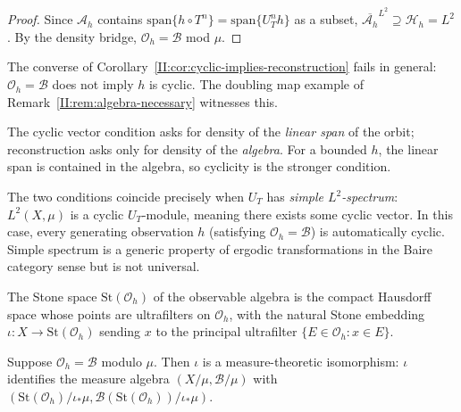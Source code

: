 \begin{proof}
Since $\mathcal{A}_h$ contains $\mathrm{span}\{h \circ T^n\} =
\mathrm{span}\{U_T^n h\}$ as a subset, $\overline{\mathcal{A}_h}^{L^2}
\supseteq \mathcal{H}_h = L^2$.  By the density bridge, $\mathcal{O}_h =
\mathcal{B}$ mod $\mu$.
\end{proof}

\begin{remark}
\label{II:rem:strict}
The converse of Corollary~\ref{II:cor:cyclic-implies-reconstruction} fails in
general: $\mathcal{O}_h = \mathcal{B}$ does not imply $h$ is cyclic.
The doubling map example of Remark~\ref{II:rem:algebra-necessary} witnesses this.

The cyclic vector condition asks for density of the \emph{linear span} of the
orbit; reconstruction asks only for density of the \emph{algebra}.  For a bounded
$h$, the linear span is contained in the algebra, so cyclicity is the stronger
condition.

The two conditions coincide precisely when $U_T$ has \emph{simple
$L^2$-spectrum}: $L^2(X,\mu)$ is a cyclic $U_T$-module, meaning there exists
some cyclic vector.  In this case, every generating observation $h$ (satisfying
$\mathcal{O}_h = \mathcal{B}$) is automatically cyclic.  Simple spectrum is
a generic property of ergodic transformations in the Baire category sense
\cite{Halmos1944} but is not universal.
\end{remark}


The Stone space $\mathrm{St}(\mathcal{O}_h)$ of the observable algebra is the
compact Hausdorff space whose points are ultrafilters on $\mathcal{O}_h$, with
the natural Stone embedding $\iota : X \to \mathrm{St}(\mathcal{O}_h)$ sending
$x$ to the principal ultrafilter $\{E \in \mathcal{O}_h : x \in E\}$.

\begin{theorem}
\label{II:thm:stone-id}
Suppose $\mathcal{O}_h = \mathcal{B}$ modulo $\mu$.  Then $\iota$ is a
measure-theoretic isomorphism: $\iota$ identifies the measure algebra
$(X/\mu, \mathcal{B}/\mu)$ with
$(\mathrm{St}(\mathcal{O}_h)/\iota_*\mu,
\mathcal{B}(\mathrm{St}(\mathcal{O}_h))/\iota_*\mu)$.
\end{theorem}

